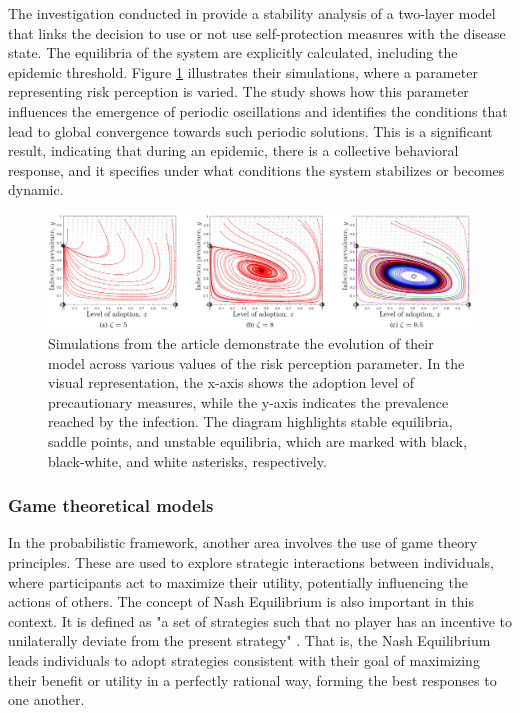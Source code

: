 The investigation conducted in \cite{Frieswijk_2022} provide a stability analysis of a two-layer model that links the decision to use or not use self-protection measures with the disease state. The equilibria of the system are explicitly calculated, including the epidemic threshold. Figure \ref{fig:stability_friesjiw} illustrates their simulations, where a parameter representing risk perception is varied. The study shows how this parameter influences the emergence of periodic oscillations and identifies the conditions that lead to global convergence towards such periodic solutions. This is a significant result, indicating that during an epidemic, there is a collective behavioral response, and it specifies under what conditions the system stabilizes or becomes dynamic.

\begin{figure}[ht]
	\centering
	\includegraphics[width=0.95\linewidth]{0_introduction/images_review/stable_unstable_equilibria_friejs}
	\caption[Stability analysis of epi-behavior model]{Simulations from the article \cite{Frieswijk_2022} demonstrate the evolution of their model across various values of the risk perception parameter. In the visual representation, the x-axis shows the adoption level of precautionary measures, while the y-axis indicates the prevalence reached by the infection. The diagram highlights stable equilibria, saddle points, and unstable equilibria, which are marked with black, black-white, and white asterisks, respectively.}
	\label{fig:stability_friesjiw}
\end{figure}

\subsubsection{Game theoretical models}
In the probabilistic framework, another area involves the use of game theory principles. These are used to explore strategic interactions between individuals, where participants act to maximize their utility, potentially influencing the actions of others. The concept of Nash Equilibrium is also important in this context. It is defined as "a set of strategies such that no player has an incentive to unilaterally deviate from the present strategy" \cite{Wang_2015_review}. That is, the Nash Equilibrium leads individuals to adopt strategies consistent with their goal of maximizing their benefit or utility in a perfectly rational way, forming the best responses to one another.

